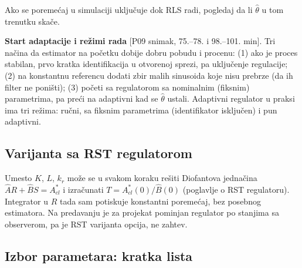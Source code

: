 \documentclass[11pt,a4paper,parskip=half,headsepline,numbers=noenddot]{scrartcl}
\DeclareRobustCommand{\izvor}[1]{{\small\color{izvorC}[#1]}}
\begin{document}
Ako se poremećaj u simulaciji uključuje dok RLS radi, pogledaj da li \(\hat\theta\) u tom trenutku skače.

\textbf{Start adaptacije i režimi rada} \izvor{P09 snimak, 75.--78. i 98.--101. min}. Tri načina da estimator na početku dobije dobru pobudu i procenu: (1) ako je proces stabilan, prvo kratka identifikacija u otvorenoj sprezi, pa uključenje regulacije; (2) na konstantnu referencu dodati zbir malih sinusoida koje nisu prebrze (da ih filter ne poništi); (3) početi sa regulatorom sa nominalnim (fiksnim) parametrima, pa preći na adaptivni kad se \(\hat\theta\) ustali. Adaptivni regulator u praksi ima tri režima: ručni, sa fiksnim parametrima (identifikator isključen) i pun adaptivni.

\subsection{Varijanta sa RST regulatorom}

Umesto \(K\), \(L\), \(k_r\) može se u svakom koraku rešiti Diofantova jednačina \(\hat A R + \hat B S = A_{cl}^*\) i izračunati \(T = A_{cl}^*(0)/\hat B(0)\) (poglavlje o RST regulatoru). Integrator u \(R\) tada sam potiskuje konstantni poremećaj, bez posebnog estimatora. Na predavanju je za projekat pominjan regulator po stanjima sa observerom, pa je RST varijanta opcija, ne zahtev.

\subsection{Izbor parametara: kratka lista}
\end{document}
